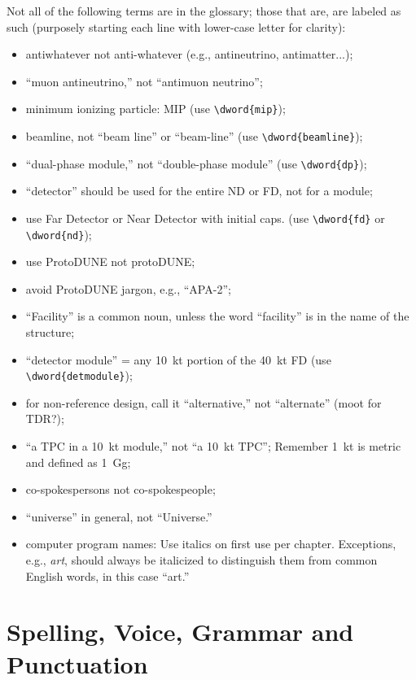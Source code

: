 Not all of the following terms are in the glossary; those that are, are labeled as such (purposely starting each line with lower-case letter for clarity):
\begin{itemize}
\item antiwhatever not anti-whatever (e.g., antineutrino, antimatter...);
\item ``muon antineutrino,'' not ``antimuon neutrino'';
\item minimum ionizing particle: MIP (use \verb|\dword{mip}|);
\item beamline, not ``beam line'' or ``beam-line'' (use \verb|\dword{beamline}|);
\item ``dual-phase module,'' not ``double-phase module'' (use \verb|\dword{dp}|);
\item ``detector'' should be used for the entire ND or FD, not for a module;
\item use Far Detector or Near Detector with initial caps. (use \verb|\dword{fd}| or \verb|\dword{nd}|);
\item use ProtoDUNE not protoDUNE;
\item avoid ProtoDUNE jargon, e.g., ``APA-2'';
\item  ``Facility'' is a common noun, unless the word ``facility'' is in the name of the structure;
\item ``detector module'' = any \SI{10}{kt} portion of the \SI{40}{kt} FD (use \verb|\dword{detmodule}|);
\item for non-reference design, call it ``alternative,'' not ``alternate'' (moot for TDR?);
\item ``a TPC in a \SI{10}{kt} module,'' not ``a \SI{10}{kt}  TPC''; Remember \SI{1}{kt} is metric and defined as \SI{1}{Gg};
\item co-spokespersons not co-spokespeople;
\item ``universe'' in general, not ``Universe.''
\item computer program names: Use italics on first use per chapter. Exceptions, e.g., \textit{art}, should always be italicized to distinguish them from common English words, in this case ``art.''
\end{itemize}

\section{Spelling, Voice, Grammar and Punctuation}
\label{sec:english-spelling}

